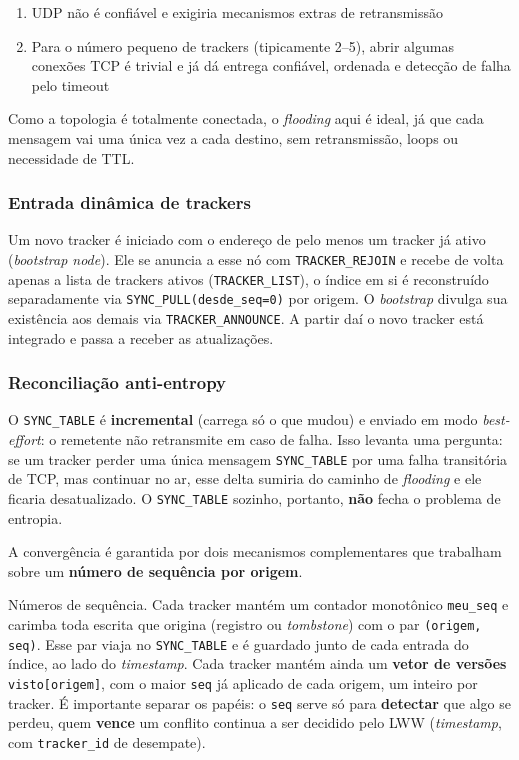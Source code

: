 \documentclass[12pt, a4paper]{article}
\begin{document}
\begin{enumerate}
    \item UDP não é confiável e exigiria mecanismos extras de retransmissão
    \item Para o número pequeno de trackers (tipicamente 2--5), abrir algumas conexões TCP é trivial e já dá entrega confiável, ordenada e detecção de falha pelo timeout
\end{enumerate}

Como a topologia é totalmente conectada, o \textit{flooding} aqui é ideal, já que cada mensagem vai uma única vez a cada destino, sem retransmissão, loops ou necessidade de TTL.

\subsubsection*{Entrada dinâmica de trackers}
Um novo tracker é iniciado com o endereço de pelo menos um tracker já ativo (\textit{bootstrap node}). Ele se anuncia a esse nó com \texttt{TRACKER\_REJOIN} e recebe de volta apenas a lista de trackers ativos (\texttt{TRACKER\_LIST}), o índice em si é reconstruído separadamente via \texttt{SYNC\_PULL(desde\_seq=0)} por origem. O \textit{bootstrap} divulga sua existência aos demais via \texttt{TRACKER\_ANNOUNCE}. A partir daí o novo tracker está integrado e passa a receber as atualizações.

\subsubsection*{Reconciliação anti-entropy}

O \texttt{SYNC\_TABLE} é \textbf{incremental} (carrega só o que mudou) e enviado em modo \textit{best-effort}: o remetente não retransmite em caso de falha. Isso levanta uma pergunta: se um tracker perder uma única mensagem \texttt{SYNC\_TABLE} por uma falha transitória de TCP, mas continuar no ar, esse delta sumiria do caminho de \textit{flooding} e ele ficaria desatualizado. O \texttt{SYNC\_TABLE} sozinho, portanto, \textbf{não} fecha o problema de entropia.

A convergência é garantida por dois mecanismos complementares que trabalham sobre um \textbf{número de sequência por origem}.

Números de sequência. Cada tracker mantém um contador monotônico \texttt{meu\_seq} e carimba toda escrita que origina (registro ou \textit{tombstone}) com o par \texttt{(origem, seq)}. Esse par viaja no \texttt{SYNC\_TABLE} e é guardado junto de cada entrada do índice, ao lado do \textit{timestamp}. Cada tracker mantém ainda um \textbf{vetor de versões} \texttt{visto[origem]}, com o maior \texttt{seq} já aplicado de cada origem, um inteiro por tracker. É importante separar os papéis: o \texttt{seq} serve só para \textbf{detectar} que algo se perdeu, quem \textbf{vence} um conflito continua a ser decidido pelo LWW (\textit{timestamp}, com \texttt{tracker\_id} de desempate).
\end{document}
